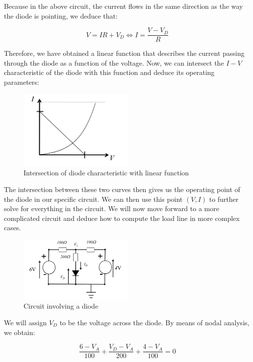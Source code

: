 \documentclass{article}
\begin{document}
Because in the above circuit, the current flows in the same direction as the way the diode is pointing, we deduce that:

\[ V = IR + V_D \iff I = \frac{V - V_D}{R} \]

Therefore, we have obtained a linear function that describes the current passing through the diode as a function of the voltage. Now, we can intersect the $I-V$ characteristic of the diode with this function and deduce its operating parameters:

\begin{figure}[h]
    \centering
    \includegraphics[width = 0.5\textwidth]{images/diode3.png}
    \caption{Intersection of diode characteristic with linear function}
    \label{fig:diode3}
\end{figure}

The intersection between these two curves then gives us the operating point of the diode in our specific circuit. We can then use this point $(V, I)$ to further solve for everything in the circuit. We will now move forward to a more complicated circuit and deduce how to compute the load line in more complex cases.

\newpage

\begin{figure}[h]
    \centering
    \includegraphics[width = 0.5\textwidth]{images/diode4.png}
    \caption{Circuit involving a diode}
    \label{fig:diode-circuit}
\end{figure}

We will assign $V_D$ to be the voltage across the diode. By means of nodal analysis, we obtain:

\[ \frac{6 - V_A}{100} + \frac{V_D - V_A}{200} + \frac{4 - V_A}{100} = 0 \]
\end{document}
